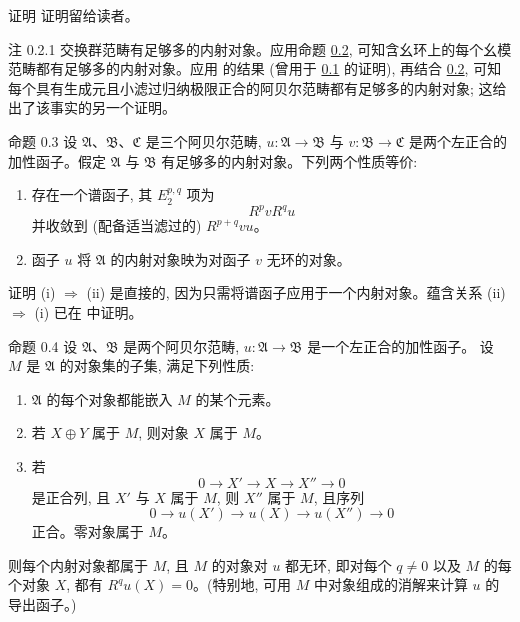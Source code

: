 \begin{enonce*}[remark]{证明}
证明留给读者。
\end{enonce*}

\begin{enonce*}[remark]{注 0.2.1}
交换群范畴有足够多的内射对象。应用命题 \hyperref[V.prop0.2]{0.2}, 可知含幺环上的每个幺模范畴都有足够多的内射对象。应用 \cite{sga4.exp.V.bib.5} 的结果 (曾用于 \hyperref[V.prop0.1]{0.1} 的证明), 再结合 \hyperref[V.prop0.2]{0.2}, 可知每个具有生成元且小滤过归纳极限正合的阿贝尔范畴都有足够多的内射对象; 这给出了该事实的另一个证明。
\end{enonce*}

\begin{enonce*}{命题 0.3}
设 $\mathfrak{A}$、$\mathfrak{B}$、$\mathfrak{C}$ 是三个阿贝尔范畴, $u : \mathfrak{A} \rightarrow
\mathfrak{B}$ 与 $v : \mathfrak{B} \rightarrow \mathfrak{C}$ 是两个左正合的加性函子。假定 $\mathfrak{A}$ 与 $\mathfrak{B}$ 有足够多的内射对象。下列两个性质等价:
\begin{enumerate}
\renewcommand{\theenumi}{\roman{enumi}}
\renewcommand{\labelenumi}{\theenumi)}
\item 存在一个谱函子, 其 $E^{p, q}_2$ 项为
$$
R^p vR^qu
$$
并收敛到 (配备适当滤过的) $R^{p+q} vu$。
\item 函子 $u$ 将 $\mathfrak{A}$ 的内射对象映为对函子 $v$ 无环的对象。
\end{enumerate}
\end{enonce*}

\begin{enonce*}[remark]{证明}
(i) $\Rightarrow$ (ii) 是直接的, 因为只需将谱函子应用于一个\pageoriginale 内射对象。蕴含关系 (ii) $\Rightarrow$ (i) 已在 \cite{sga4.exp.V.bib.11} 中证明。
\end{enonce*}

\begin{enonce*}{命题 0.4}
设 $\mathfrak{A}$、$\mathfrak{B}$ 是两个阿贝尔范畴, $u : \mathfrak{A} \rightarrow \mathfrak{B}$ 是一个左正合的加性函子。%
设 $M$ 是 $\mathfrak{A}$ 的对象集的子集, 满足下列性质:
\begin{enumerate}
\renewcommand{\labelenumi}{\theenumi)}
\item $\mathfrak{A}$ 的每个对象都能嵌入 $M$ 的某个元素。

\item 若 $X \oplus Y$ 属于 $M$, 则对象 $X$ 属于 $M$。

\item 若
$$
0 \longrightarrow X' \longrightarrow X \longrightarrow X''
\longrightarrow 0
$$
是正合列, 且 $X'$ 与 $X$ 属于 $M$, 则 $X''$ 属于 $M$, 且序列
$$
0 \longrightarrow u(X') \longrightarrow u(X) \longrightarrow u(X'')
\longrightarrow 0
$$
正合。零对象属于 $M$。
\end{enumerate}

则每个内射对象都属于 $M$, 且 $M$ 的对象对 $u$ 都无环, 即对每个 $q \neq 0$ 以及 $M$ 的每个对象 $X$, 都有 $R^q u(X) = 0$。(特别地, 可用 $M$ 中对象组成的消解来计算 $u$ 的导出函子。)
\end{enonce*}

